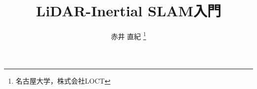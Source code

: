 \documentclass[uplatex,dvipdfmx,a4paper]{jsbook}
\theoremstyle{plain}%
\theoremstyle{definition}
\theoremstyle{remark}
\begin{document}

\title{LiDAR-Inertial SLAM入門}
\author{赤井 直紀%
  \thanks{名古屋大学，株式会社LOCT}
}

\maketitle














































%




\end{document}
